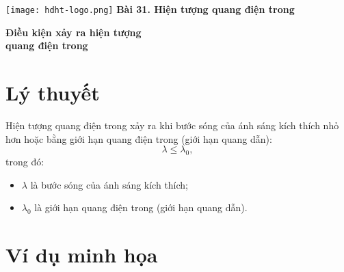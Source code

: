 \newcommand{\chapter}[2][]{
	\newcommand{\chapname}{#2}
	\begin{flushleft}
		\begin{minipage}[t]{\linewidth}
			\texttt{[image: hdht-logo.png]}
			\hspace{0pt}	
			\sffamily\bfseries\large Bài 31. Hiện tượng quang điện trong
			\begin{flushleft}
				\huge\bfseries #1
			\end{flushleft}
		\end{minipage}
	\end{flushleft}
	\vspace{1cm}
	\normalfont\normalsize
}
\chapter[Điều kiện xảy ra hiện tượng \\quang điện trong]{Điều kiện xảy ra hiện tượng quang điện trong}
\section{Lý thuyết}
Hiện tượng quang điện trong xảy ra khi bước sóng của ánh sáng kích thích nhỏ hơn hoặc bằng giới hạn quang điện trong (giới hạn quang dẫn):
\begin{equation}
	\lambda \leq \lambda_0,
\end{equation}
trong đó:
\begin{itemize}
	\item $\lambda$ là bước sóng của ánh sáng kích thích;
	\item $\lambda_0$ là giới hạn quang điện trong (giới hạn quang dẫn).
\end{itemize}

\section{Ví dụ minh họa}



